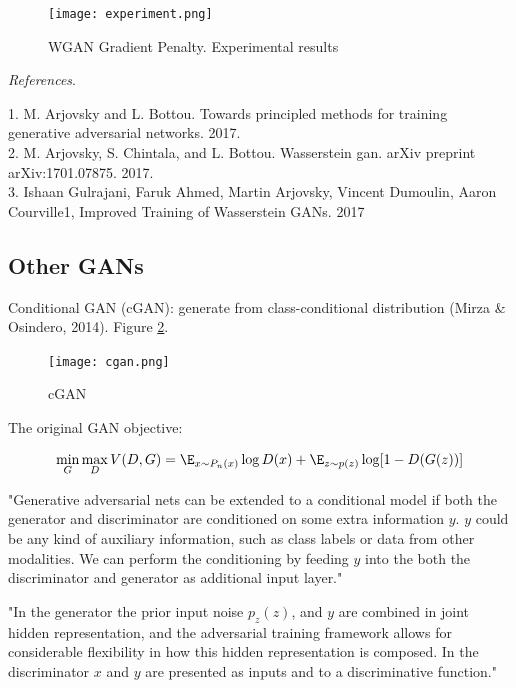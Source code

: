 \documentclass[english]{article}
\begin{document}
\begin{figure}[h!]
  \centering
  \texttt{[image: experiment.png]}
    \caption{WGAN Gradient Penalty. Experimental results}
  \label{wgan_gp_exp}
 \end{figure}

\item {\emph{References}}.

1. M. Arjovsky and L. Bottou. Towards principled methods for training generative adversarial networks. 2017.\\
2. M. Arjovsky, S. Chintala, and L. Bottou. Wasserstein gan. arXiv preprint arXiv:1701.07875. 2017.\\
3. Ishaan Gulrajani, Faruk Ahmed, Martin Arjovsky, Vincent Dumoulin, Aaron Courville1, Improved Training of Wasserstein GANs. 2017\\

\eenum


\subsection{Other GANs}

\benum 
\item Conditional GAN (cGAN): generate from class-conditional distribution (Mirza \& Osindero, 2014). Figure \ref{cGAN}. 

\begin{figure}[h!]
  \centering
  \texttt{[image: cgan.png]}
    \caption{cGAN}
  \label{cGAN}
 \end{figure}


\item 
The original GAN objective: 

$$\min_G\max_D V(D,G) 
= \E_{x\sim P_n(x)}\log D(x) + 
\E_{z\sim p(z)} \log[1-D(G(z))] $$

"Generative adversarial nets can be extended to a conditional model if both the generator and discriminator are conditioned on some extra information $y$. $y$ could be any kind of auxiliary information,
such as class labels or data from other modalities. We can perform the conditioning by feeding $y$
into the both the discriminator and generator as additional input layer."

"In the generator the prior input noise $p_z(z)$, and $y$ are combined in joint hidden representation, and the adversarial training framework allows for considerable flexibility in how this hidden representation is composed.
In the discriminator $x$ and $y$ are presented as inputs and to a discriminative function."
\end{document}

